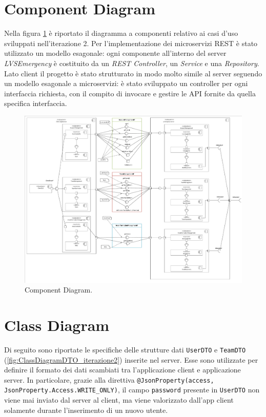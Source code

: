 \section{Component Diagram}
Nella figura \ref{fig:ComponentDiagram_iterazione2} è riportato il diagramma a componenti relativo ai casi d'uso sviluppati nell'iterazione 2. Per l'implementazione dei microservizi REST è stato utilizzato un modello esagonale: ogni componente all'interno del server \textit{LVSEmergency} è costituito da un \textit{REST Controller}, un \textit{Service} e una \textit{Repository}.
Lato client il progetto è stato strutturato in modo molto simile al server seguendo un modello esagonale a microservizi: è stato sviluppato un controller per ogni interfaccia richiesta, con il compito di invocare e gestire le API fornite da quella specifica interfaccia. 

\begin{figure}[h!]
	\centering
	\includegraphics[width=1\linewidth]{./Iterazione 2/OtherFiles/UML - Component View}
	\caption{Component Diagram.}
	\label{fig:ComponentDiagram_iterazione2}
\end{figure}

\clearpage

\section{Class Diagram}
Di seguito sono riportate le specifiche delle strutture dati \texttt{UserDTO} e \texttt{TeamDTO} (\Fig\ref{fig:ClassDiagramDTO_iterazione2}) inserite nel server. Esse sono utilizzate per definire il formato dei dati scambiati tra l'applicazione client e applicazione server. In particolare, grazie alla direttiva \texttt{@JsonProperty(access, JsonProperty.Access.WRITE\_ONLY)}, il campo \texttt{password} presente in \texttt{UserDTO} non viene mai inviato dal server al client, ma viene valorizzato dall'app client solamente durante l'inserimento di un nuovo utente.  


